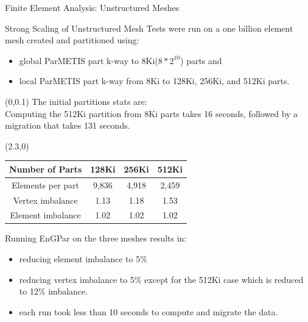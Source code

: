 \documentclass{beamer}
\begin{document}
\begin{textblock}{15.6}
\begin{textblock}{5}
\begin{block}{\centering Finite Element Analysis: Unstructured Meshes}
\begin{figure}
      \end{figure}
    \end{block}
    \begin{block}{\centering Strong Scaling of Unstructured Mesh}
      Tests were run on a one billion element mesh created and partitioned using:
      \begin{itemize}
      \item global ParMETIS part k-way to 8Ki($8*2^{10}$) parts and
      \item local ParMETIS part k-way from 8Ki to 128Ki, 256Ki, and 512Ki parts.
      \end{itemize}
      \begin{textblock}{2.3}(0,0.1)
        The initial partitions stats are: \\[1cm]

        Computing the 512Ki partition from 8Ki parts takes 16 seconds, followed by a migration that takes 131 seconds.
        
      \end{textblock}
      \begin{textblock}{2.5}(2.3,0)
      \begin{table}[!h]
        \centering
        \begin{tabular}{||c|c|c|c||}
          \hline
          Number of Parts &128Ki&256Ki&512Ki \\
          \hline
          Elements per part & 9,836 & 4,918&2,459  \\
          \hline
          Vertex imbalance & 1.13 & 1.18 & 1.53 \\
          \hline
          Element imbalance & 1.02& 1.02& 1.02\\
          \hline
        \end{tabular}
      \end{table}
      \end{textblock}
      \vspace{10cm}

      Running EnGPar on the three meshes results in:
      \begin{itemize}
      \item reducing element imbalance to 5\%
      \item reducing vertex imbalance to 5\% except for the 512Ki case which is reduced to 12\% imbalance.
      \item each run took less than 10 seconds to compute and migrate the data.
      \end{itemize}
      

\end{block}
\end{textblock}
\end{textblock}
\end{document}
